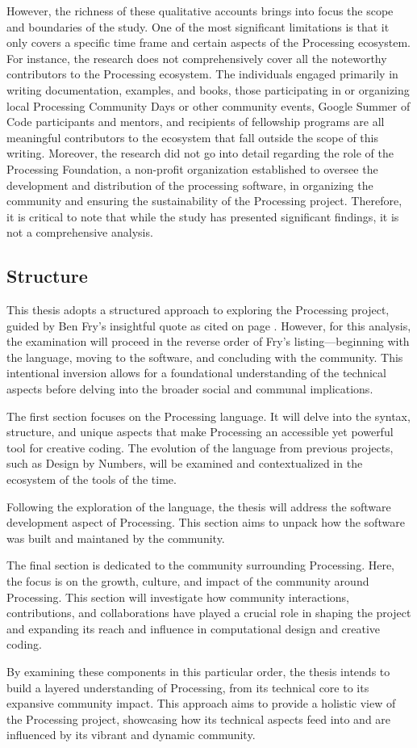 However, the richness of these qualitative accounts brings into focus the scope and boundaries of the study. One of the most significant limitations is that it only covers a specific time frame and certain aspects of the Processing ecosystem. For instance, the research does not comprehensively cover all the noteworthy contributors to the Processing ecosystem. The individuals engaged primarily in writing documentation, examples, and books, those participating in or organizing local Processing Community Days or other community events, Google Summer of Code participants and mentors, and recipients of fellowship programs are all meaningful contributors to the ecosystem that fall outside the scope of this writing. Moreover, the research did not go into detail regarding the role of the Processing Foundation, a non-profit organization established to oversee the development and distribution of the processing software, in organizing the community and ensuring the sustainability of the Processing project. Therefore, it is critical to note that while the study has presented significant findings, it is not a comprehensive analysis.

\subsection{Structure}
This thesis adopts a structured approach to exploring the Processing project, guided by Ben Fry's insightful quote as cited on page \pageref{fry_quote}. However, for this analysis, the examination will proceed in the reverse order of Fry’s listing—beginning with the language, moving to the software, and concluding with the community. This intentional inversion allows for a foundational understanding of the technical aspects before delving into the broader social and communal implications.

The first section focuses on the Processing language. It will delve into the syntax, structure, and unique aspects that make Processing an accessible yet powerful tool for creative coding. The evolution of the language from previous projects, such as Design by Numbers, will be examined and contextualized in the ecosystem of the tools of the time. 

Following the exploration of the language, the thesis will address the software development aspect of Processing. This section aims to unpack how the software was built and maintaned by the community.

The final section is dedicated to the community surrounding Processing. Here, the focus is on the growth, culture, and impact of the community around Processing. This section will investigate how community interactions, contributions, and collaborations have played a crucial role in shaping the project and expanding its reach and influence in computational design and creative coding.

By examining these components in this particular order, the thesis intends to build a layered understanding of Processing, from its technical core to its expansive community impact. This approach aims to provide a holistic view of the Processing project, showcasing how its technical aspects feed into and are influenced by its vibrant and dynamic community.
